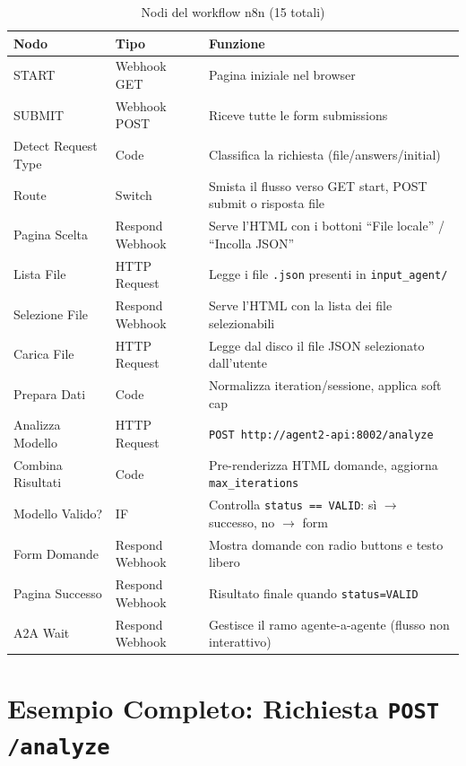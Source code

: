 \documentclass[12pt,a4paper]{report}
\begin{document}
\begin{table}[H]
\centering
\renewcommand{\arraystretch}{1.3}
\begin{tabularx}{\textwidth}{l l X}
\toprule
\textbf{Nodo} & \textbf{Tipo} & \textbf{Funzione} \\
\midrule
START               & Webhook GET      & Pagina iniziale nel browser \\
SUBMIT              & Webhook POST     & Riceve tutte le form submissions \\
Detect Request Type & Code             & Classifica la richiesta (file/answers/initial) \\
Route               & Switch           & Smista il flusso verso GET start, POST submit o risposta file \\
Pagina Scelta       & Respond Webhook  & Serve l'HTML con i bottoni ``File locale'' / ``Incolla JSON'' \\
Lista File          & HTTP Request     & Legge i file \texttt{.json} presenti in \texttt{input\_agent/} \\
Selezione File      & Respond Webhook  & Serve l'HTML con la lista dei file selezionabili \\
Carica File         & HTTP Request     & Legge dal disco il file JSON selezionato dall'utente \\
Prepara Dati        & Code             & Normalizza iteration/sessione, applica soft cap \\
Analizza Modello    & HTTP Request     & \texttt{POST http://agent2-api:8002/analyze} \\
Combina Risultati   & Code             & Pre-renderizza HTML domande, aggiorna \texttt{max\_iterations} \\
Modello Valido?     & IF               & Controlla \texttt{status == VALID}: sì $\to$ successo, no $\to$ form \\
Form Domande        & Respond Webhook  & Mostra domande con radio buttons e testo libero \\
Pagina Successo     & Respond Webhook  & Risultato finale quando \texttt{status=VALID} \\
A2A Wait            & Respond Webhook  & Gestisce il ramo agente-a-agente (flusso non interattivo) \\
\bottomrule
\end{tabularx}
\caption{Nodi del workflow n8n (15 totali)}
\label{tab:n8n-nodes}
\end{table}

\section{Esempio Completo: Richiesta \texttt{POST /analyze}}
\end{document}
